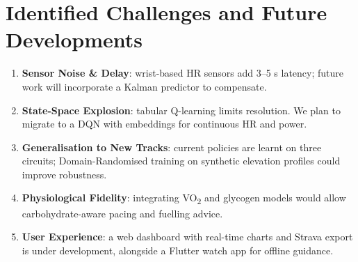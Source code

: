 \documentclass[a4paper,12pt]{article}
\begin{document}
\section{Identified Challenges and Future Developments}
\begin{enumerate}
  \item \textbf{Sensor Noise \& Delay}: wrist-based HR sensors add 3–5 s latency; future work will incorporate a Kalman predictor to compensate.
  \item \textbf{State-Space Explosion}: tabular Q-learning limits resolution.  We plan to migrate to a DQN with embeddings for continuous HR and power.
  \item \textbf{Generalisation to New Tracks}: current policies are learnt on three circuits; Domain-Randomised training on synthetic elevation profiles could improve robustness.
  \item \textbf{Physiological Fidelity}: integrating VO\textsubscript{2} and glycogen models would allow carbohydrate-aware pacing and fuelling advice.
  \item \textbf{User Experience}: a web dashboard with real-time charts and Strava export is under development, alongside a Flutter watch app for offline guidance.
\end{enumerate}

\end{document}
